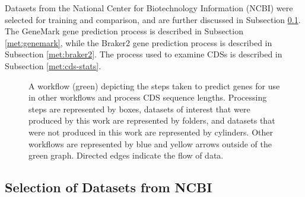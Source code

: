 Datasets from the National Center for Biotechnology Information (NCBI) were selected for training and comparison, and are further
discussed in Subsection \ref{met:datasets}. The GeneMark gene prediction
process is described in Subsection \ref{met:genemark}, while the Braker2
gene prediction process is described in Subsection \ref{met:braker2}. The
process used to examine CDSs is described in Subsection \ref{met:cds-stats}.

\begin{figure}
  \centering
  \caption{A workflow (green) depicting the steps taken to predict
    genes for use in other workflows and process CDS sequence
    lengths. Processing steps are represented by boxes, datasets of
    interest that were produced by this work are represented by
    folders, and datasets that were not produced in this work are
    represented by cylinders. Other workflows are represented by blue
    and yellow arrows outside of the green graph. Directed edges
    indicate the flow of data.}
  \label{fig:predict-workflow}
\end{figure}

\subsection{Selection of Datasets from NCBI}
\label{met:datasets}

